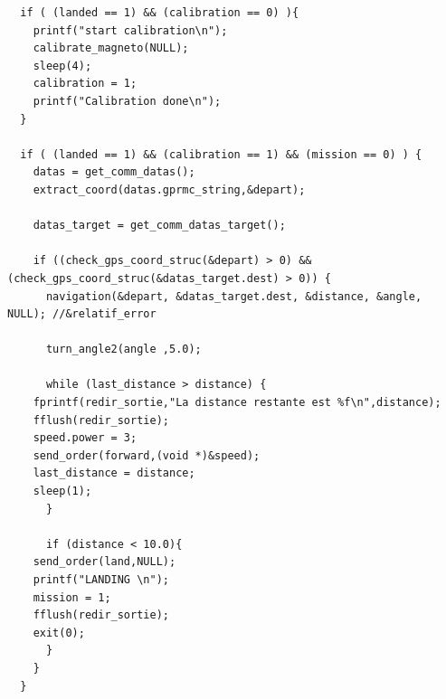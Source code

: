 \begin{lstlisting}
  if ( (landed == 1) && (calibration == 0) ){
    printf("start calibration\n");
    calibrate_magneto(NULL);
    sleep(4);
    calibration = 1;
    printf("Calibration done\n");
  }

  if ( (landed == 1) && (calibration == 1) && (mission == 0) ) {	  
    datas = get_comm_datas();	
    extract_coord(datas.gprmc_string,&depart);

    datas_target = get_comm_datas_target();
	
    if ((check_gps_coord_struc(&depart) > 0) && (check_gps_coord_struc(&datas_target.dest) > 0)) {
      navigation(&depart, &datas_target.dest, &distance, &angle, NULL); //&relatif_error
	
      turn_angle2(angle ,5.0);
	
      while (last_distance > distance) {
	fprintf(redir_sortie,"La distance restante est %f\n",distance);
	fflush(redir_sortie);
	speed.power = 3;
	send_order(forward,(void *)&speed);
	last_distance = distance;
	sleep(1);
      }

      if (distance < 10.0){
	send_order(land,NULL); 
	printf("LANDING \n");
	mission = 1;
	fflush(redir_sortie);
	exit(0);
      }	
    }
  }
\end{lstlisting}




